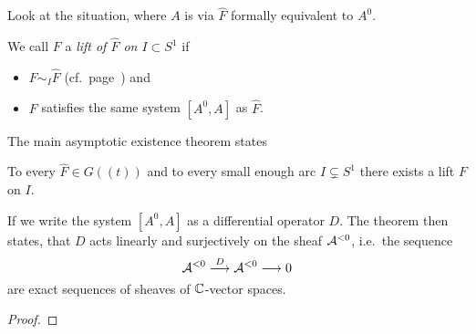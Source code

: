 Look at the situation, where $A$ is via $\hat F$ formally equivalent to $A^0$.

\begin{defn}
  We call $F$ a \emph{lift of $\hat F$ on $I\subset S^1$} if
  \begin{itemize}
    \item $F\sim_I\hat F$
      (cf.\ page~\pageref{page:notationForAsymptoticExpansion}) and
    \item $F$ satisfies the same system $[A^0,A]$ as $\hat F$.
  \end{itemize}
\end{defn}
The main asymptotic existence theorem states
\begin{thm}[M.E.A.T]\label{thm:meat}
  To every $\hat F\in G(\!(t)\!)$ and to every small enough arc
  $I\subsetneq S^1$ there exists a lift $F$ on $I$.
  \begin{s-rem}
    If we write the system $[A^0,A]$ as a differential operator $D$.
    The theorem then states, that $D$ acts linearly and surjectively on the
    sheaf $\mathcal{A}^{<0}$, i.e.\ the sequence
    \[
      \mathcal{A}^{<0}\overset{D}\longrightarrow\mathcal{A}^{<0} \longrightarrow 0
    \]
    are exact sequences of sheaves of $\mathbb{C}$-vector spaces.
    \begin{comment}
      Proof in \textbf{[Mal91a, App 1; Thm 1]}
    \end{comment}
  \end{s-rem}
\end{thm}
\begin{proof}
  \TODO{}
\end{proof}

\begin{comment}
  \begin{rem}
    We are then able to find a \rewrite{(cyclic)} covering of the $S^1$ of
    arcs such that on every arc there exists a lift $\tilde F$ of $\hat F$.
  \end{rem}
\end{comment}
\TODO{}

